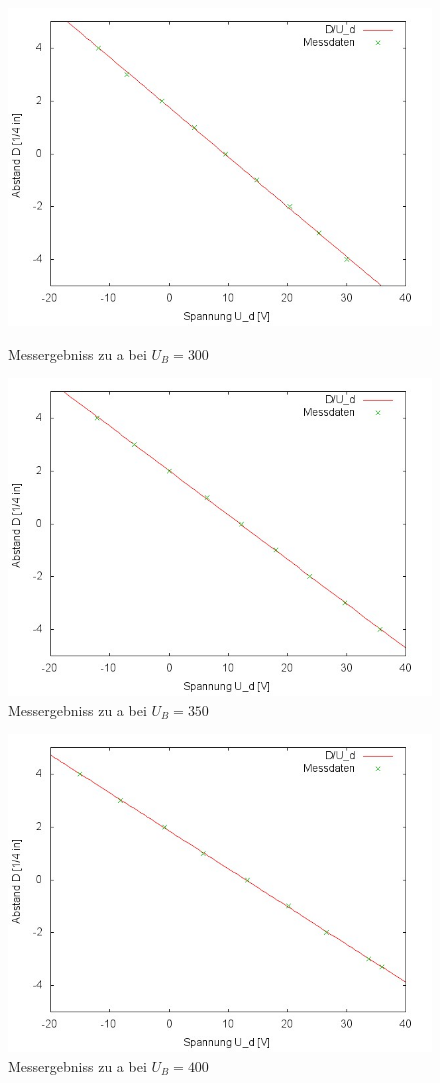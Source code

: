 		\begin{figure}[htbp]
			\centering
			\includegraphics[width = 12cm]{img/501a300.jpg}
			\caption{Messergebniss zu a bei $U_B = 300$}
			\label{501a300}
		
			\centering
			\includegraphics[width = 12cm]{img/501a350.jpg}
			\caption{Messergebniss zu a bei $U_B = 350$}
			\label{501a350}
		\end{figure}
		\begin{figure}[htbp]
			\centering
			\includegraphics[width = 12cm]{img/501a400.jpg}
			\caption{Messergebniss zu a bei $U_B = 400$}
			\label{501a400}
		\end{figure}

